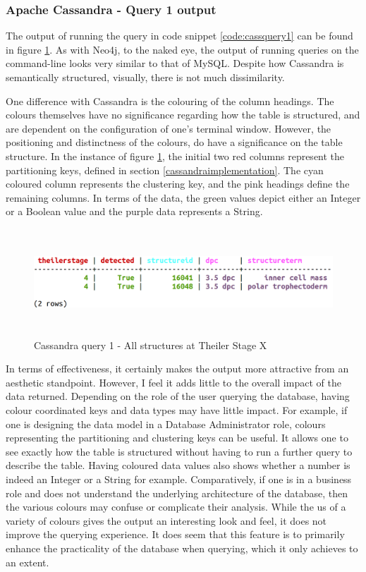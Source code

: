\subsubsection*{Apache Cassandra - Query 1 output}\label{cassquery1output}
The output of running the query in code snippet \ref{code:cassquery1} can be found in figure \ref{fig:cassandraquery1}. As with Neo4j, to the naked eye, the output of running queries on the command-line looks very similar to that of MySQL. Despite how Cassandra is semantically structured, visually, there is not much dissimilarity.

One difference with Cassandra is the colouring of the column headings. The colours themselves have no significance regarding how the table is structured, and are dependent on the configuration of one's terminal window. However, the positioning and distinctness of the colours, do have a significance on the table structure. In the instance of figure \ref{fig:cassandraquery1}, the initial two red columns represent the partitioning keys, defined in section \ref{cassandraimplementation}. The cyan coloured column represents the clustering key, and the pink headings define the remaining columns. In terms of the data, the green values depict either an Integer or a Boolean value and the purple data represents a String.

\begin{figure}[H]\begin{center}\includegraphics[height=4cm,width=0.9\linewidth]{images/cassandraquery1}\caption{Cassandra query 1 - All structures at Theiler Stage X}\label{fig:cassandraquery1}\end{center}\end{figure}

In terms of effectiveness, it certainly makes the output more attractive from an aesthetic standpoint. However, I feel it adds little to the overall impact of the data returned. Depending on the role of the user querying the database, having colour coordinated keys and data types may have little impact. For example, if one is designing the data model in a Database Administrator role, colours representing the partitioning and clustering keys can be useful. It allows one to see exactly how the table is structured without having to run a further query to describe the table. Having coloured data values also shows whether a number is indeed an Integer or a String for example. Comparatively, if one is in a business role and does not understand the underlying architecture of the database, then the various colours may confuse or complicate their analysis. While the us of a variety of colours gives the output an interesting look and feel, it does not improve the querying experience. It does seem that this feature is to primarily enhance the practicality of the database when querying, which it only achieves to an extent.


